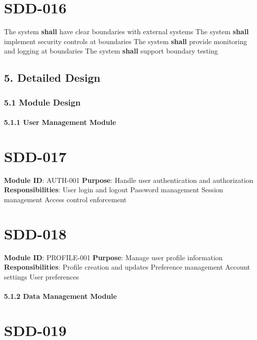 \section{SDD-016}\label{SDD-016}

The system \textbf{shall} have clear boundaries with external systems
The system \textbf{shall} implement security controls at boundaries
The system \textbf{shall} provide monitoring and logging at boundaries
The system \textbf{shall} support boundary testing

\subsection{5. Detailed Design}

\subsubsection{5.1 Module Design}

\paragraph{5.1.1 User Management Module}

\section{SDD-017}\label{SDD-017}

\textbf{Module ID}: AUTH-001
\textbf{Purpose}: Handle user authentication and authorization
\textbf{Responsibilities}:
User login and logout
Password management
Session management
Access control enforcement

\section{SDD-018}\label{SDD-018}

\textbf{Module ID}: PROFILE-001
\textbf{Purpose}: Manage user profile information
\textbf{Responsibilities}:
Profile creation and updates
Preference management
Account settings
User preferences\\

\paragraph{5.1.2 Data Management Module}

\section{SDD-019}\label{SDD-019}


